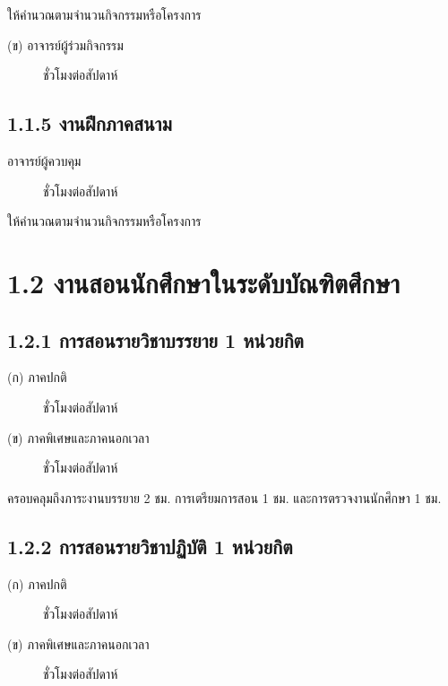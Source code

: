 \documentclass[a4paper,12pt,english]{sphinxmanual}
\begin{document}
ให้คำนวณตามจำนวนกิจกรรมหรือโครงการ
\begin{description}
\item[{(ข) อาจารย์ผู้ร่วมกิจกรรม}]  ชั่วโมงต่อสัปดาห์

\end{description}


\subsection{1.1.5 งานฝึกภาคสนาม}
\label{\detokenize{1teaching:id8}}\begin{description}
\item[{อาจารย์ผู้ควบคุม}]  ชั่วโมงต่อสัปดาห์

\end{description}

ให้คำนวณตามจำนวนกิจกรรมหรือโครงการ


\section{1.2 งานสอนนักศึกษาในระดับบัณฑิตศึกษา}
\label{\detokenize{1teaching:id9}}

\subsection{1.2.1 การสอนรายวิชาบรรยาย 1 หน่วยกิต}
\label{\detokenize{1teaching:id10}}\begin{description}
\item[{(ก) ภาคปกติ}]  ชั่วโมงต่อสัปดาห์

\item[{(ข) ภาคพิเศษและภาคนอกเวลา}]  ชั่วโมงต่อสัปดาห์

\end{description}

ครอบคลุมถึงภาระงานบรรยาย 2 ชม. การเตรียมการสอน 1 ชม. และการตรวจงานนักศึกษา 1 ชม.


\subsection{1.2.2 การสอนรายวิชาปฏิบัติ 1 หน่วยกิต}
\label{\detokenize{1teaching:id11}}\begin{description}
\item[{(ก) ภาคปกติ}]  ชั่วโมงต่อสัปดาห์

\item[{(ข) ภาคพิเศษและภาคนอกเวลา}]  ชั่วโมงต่อสัปดาห์

\end{description}
\end{document}
